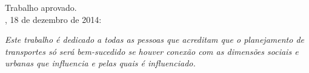 \documentclass[
  12pt,        %
  openright,      %
  twoside,      %
  a4paper,      %
  english,      %
  brazil        %
]{abntex2}
\begin{document}
%
% 
%
\begin{folhadeaprovacao}

  \begin{center}
    {\ABNTEXchapterfont\large\imprimirautor}

    \vspace*{\fill}\vspace*{\fill}
    \begin{center}
      \ABNTEXchapterfont\bfseries\Large\imprimirtitulo
    \end{center}
    \vspace*{\fill}

    \hspace{.45\textwidth}
    \begin{minipage}{.5\textwidth}
        \imprimirpreambulo
    \end{minipage}%
    \vspace*{\fill}

   Trabalho aprovado. \\
   \imprimirlocal, 18 de dezembro de 2014: 
   \end{center}

   \assinatura{\textbf{\imprimirorientador} \\ \imprimirorientadorRotulo}

   \begin{center}
    \vspace*{0.5cm}
    {\large\imprimirlocal}
    \par
    {\large\imprimirdata}
    \vspace*{1cm}
  \end{center}

\end{folhadeaprovacao}

\begin{dedicatoria}
   \vspace*{\fill}
   \centering
   \noindent
   \textit{Este trabalho é dedicado a todas as pessoas que acreditam que o planejamento de transportes só será bem-sucedido se houver conexão com as dimensões sociais e urbanas que influencia e pelas quais é influenciado.} \vspace*{\fill}
\end{dedicatoria}
\end{document}
